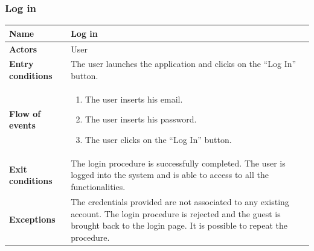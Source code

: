 \subsubsection{Log in}
\begin{table}[!h]
	\centering
	{\renewcommand{\arraystretch}{2}%
		\begin{tabular}{|l|p{12cm}|}
			\hline
			\textbf{Name} 				& \textbf{Log in} \\ \hline
			\textbf{Actors} 			& User \\ \hline
			\textbf{Entry conditions} 	& The user launches the application and clicks on the “Log In” button. \\ \hline
			\textbf{Flow of events}		& \begin{minipage}[t]{0.75\textwidth}
				\begin{enumerate}
					\item The user inserts his email.
					\item The user inserts his password.
					\item The user clicks on the “Log In” button.
				\end{enumerate}
			\end{minipage}	\\ \hline
			\textbf{Exit conditions}	& The login procedure is successfully completed. The user is logged into the system and is able to access to all the functionalities. \\ \hline
			\textbf{Exceptions}			& The credentials provided are not associated to any existing account. The login procedure is rejected and the guest is brought back to the login page. It is possible to repeat the procedure. \\ \hline
	\end{tabular}}
\end{table}

